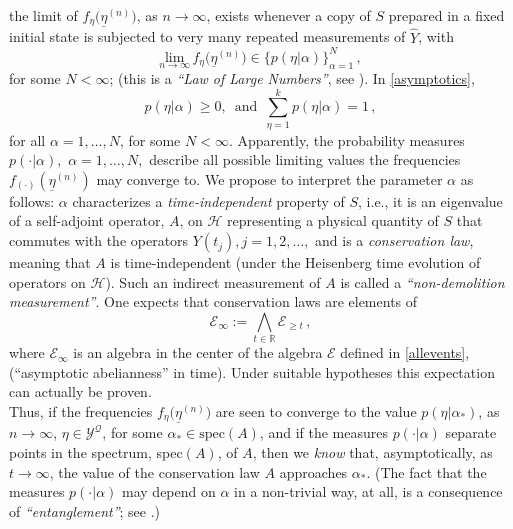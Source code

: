 \documentclass[a4paper,11pt]{article}
\begin{document}
the limit of $f_{\eta}\big(\underline{\eta}^{(n)}\big)$, as $n\rightarrow \infty$, exists whenever a copy of $S$ prepared in a fixed initial state is subjected to very many repeated measurements of $\widehat{Y}$, with
\begin{equation}\label{asymptotics}
\underset{n \rightarrow \infty}{\text{lim}}\, f_{\eta}\big(\underline{\eta}^{(n)}\big) \in \lbrace p(\eta\vert \alpha)\rbrace_{\alpha = 1}^{N}\,, 
\end{equation}
for some $N<\infty$; (this is a \textit{``Law of Large Numbers''}, see \cite{BFFS}). In \eqref{asymptotics},
\begin{equation}\label{p}
p(\eta \vert \alpha) \geq 0 , \, \text{   and   }\, \sum_{\eta=1}^{k} p(\eta \vert \alpha) =1\,,
\end{equation}
for all $\alpha=1,\dots, N$, for some $N<\infty$. Apparently, the probability measures $p(\cdot \vert \alpha), $ $\alpha = 1,\dots, N,$ describe all possible limiting values the frequencies $f_{(\cdot)}(\underline{\eta}^{(n)})$ may converge to. We propose to interpret the parameter $\alpha$ as follows: $\alpha$ characterizes a \textit{time-independent} property of $S$, i.e., it is an eigenvalue of a self-adjoint operator, $A$, on $\mathcal{H}$ representing a physical quantity of $S$ that commutes with the operators $Y(t_j), j=1,2,\dots,$ and is a 
\textit{conservation law}, meaning that $A$ is time-independent (under the Heisenberg time evolution of operators on 
$\mathcal{H}$). Such an indirect measurement of $A$ is called a \textit{``non-demolition measurement''}. One expects that conservation laws are elements of 
$$\mathcal{E}_{\infty} := \bigwedge_{t\in \mathbb{R}} \mathcal{E}_{\geq t}\,,$$
where $\mathcal{E}_{\infty}$ is an algebra in the center of the algebra $\mathcal{E}$ defined in \eqref{allevents}, (``asymptotic abelianness'' in time). Under suitable hypotheses this expectation can actually be proven. \\
Thus, if the frequencies $f_{\eta}\big(\underline{\eta}^{(n)}\big)$ are seen to converge to the value $p(\eta \vert \alpha_{*})$, as $n \rightarrow \infty$, $\eta \in \mathcal{Y}^{\mathcal{Q}}$, for some $\alpha_{*} \in \text{spec}(A)$, and if the measures $p(\cdot\vert \alpha)$ separate points in the spectrum, spec$(A)$, of $A$, then we \textit{know} that, asymptotically, as $t \rightarrow \infty$, the value of the conservation law $A$ approaches $\alpha_{*}$. (The fact that the measures 
$p(\cdot \vert \alpha)$ may depend on $\alpha$ in a non-trivial way, at all, is a consequence of \textit{``entanglement''}; see \cite{Maassen-Kummerer, Bauer-Bernard, BFFS}.)\\
\end{document}
